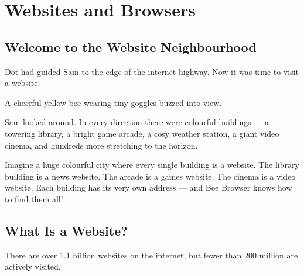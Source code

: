 
\chapter{Websites and Browsers}


\section*{Welcome to the Website Neighbourhood}

Dot had guided Sam to the edge of the internet highway.
Now it was time to visit a website.

A cheerful yellow bee wearing tiny goggles buzzed into view.


Sam looked around.
In every direction there were colourful buildings —
a towering library, a bright game arcade, a cosy weather station,
a giant video cinema, and hundreds more stretching to the horizon.

\begin{picturethis}
  Imagine a huge colourful city where every single building is a website.
  The library building is a news website.
  The arcade is a games website.
  The cinema is a video website.
  Each building has its very own address — and Bee Browser knows how to find them all!
\end{picturethis}

\sectionrule

\section*{What Is a Website?}

\begin{funfact}
There are over 1.1 billion websites on the internet, but fewer than 200 million are actively visited.
\end{funfact}

